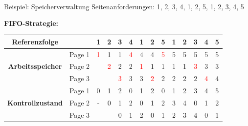 \documentclass[german]{spicker}
\begin{document}
\begin{bonus}{Beispiel: Speicherverwaltung}
    Seitenanforderungen: 1, 2, 3, 4, 1, 2, 5, 1, 2, 3, 4, 5

    \textbf{FIFO-Strategie:}

    \begin{tabular}{|c|c|c|c|c|c|c|c|c|c|c|c|c|c|}
        \hline
        \multicolumn{1}{|c}{\textbf{Referenzfolge}} & \multicolumn{1}{c|}{} & 1                  & 2                  & 3                  & 4                  & 1                  & 2                  & 5                  & 1 & 2 & 3                  & 4                  & 5 \\
        \hline
        \hline
        \multirow{3}{*}{\textbf{Arbeitsspeicher}}   & Page 1                & \textcolor{red}{1} & 1                  & 1                  & \textcolor{red}{4} & 4                  & 4                  & \textcolor{red}{5} & 5 & 5 & 5                  & 5                  & 5 \\
                                                    & Page 2                &                    & \textcolor{red}{2} & 2                  & 2                  & \textcolor{red}{1} & 1                  & 1                  & 1 & 1 & \textcolor{red}{3} & 3                  & 3 \\
                                                    & Page 3                &                    &                    & \textcolor{red}{3} & 3                  & 3                  & \textcolor{red}{2} & 2                  & 2 & 2 & 2                  & \textcolor{red}{4} & 4 \\
        \hline
        \hline
        \multirow{3}{*}{\textbf{Kontrollzustand}}   & Page 1                & 0                  & 1                  & 2                  & 0                  & 1                  & 2                  & 0                  & 1 & 2 & 3                  & 4                  & 5 \\
                                                    & Page 2                & -                  & 0                  & 1                  & 2                  & 0                  & 1                  & 2                  & 3 & 4 & 0                  & 1                  & 2 \\
                                                    & Page 3                & -                  & -                  & 0                  & 1                  & 2                  & 0                  & 1                  & 2 & 3 & 4                  & 0                  & 1 \\
        \hline
    \end{tabular}


\end{bonus}
\end{document}
